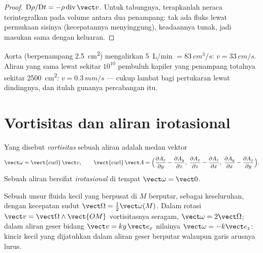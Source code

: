 \begin{proof}
$\mathrm D\rho/\mathrm Dt = -\rho\operatorname{div}\vect v$. Untuk
tabungnya, terapkanlah neraca terintegralkan pada volume antara dua
penampang: tak ada fluks lewat permukaan sisinya (kecepatannya
menyinggung), keadaannya tunak, jadi masukan sama dengan keluaran.
\end{proof}

\begin{example}[Darah]\label{ex:b2:fluid-kinematics:blood}
Aorta (berpenampang \qty{2.5}{cm^2}) mengalirkan \qty{5}{L/min} $= \qty{83}{cm^3/s}$:
$v = \qty{33}{cm/s}$. Aliran yang sama lewat sekitar $10^{10}$
pembuluh kapiler yang penampang totalnya sekitar \qty{2500}{cm^2}: $v = \qty{0.3}{mm/s}$ ---
cukup lambat bagi pertukaran lewat dindingnya, dan itulah gunanya percabangan itu.
\end{example}

\section{Vortisitas dan aliran irotasional}

\begin{definition}[Vortisitas]\label{def:b2:fluid-kinematics:vorticity}
Yang disebut \emph{vortisitas} sebuah aliran adalah medan vektor
\[
\vect\omega = \operatorname{\vect{curl}}\vect v , \qquad
\operatorname{\vect{curl}}\vect A = \Bigl(\frac{\partial A_z}{\partial y} -
\frac{\partial A_y}{\partial z},\; \frac{\partial A_x}{\partial z} - \frac{\partial A_z}
{\partial x},\; \frac{\partial A_y}{\partial x} - \frac{\partial A_x}{\partial y}\Bigr) .
\]
Sebuah aliran bersifat \emph{irotasional} di tempat $\vect\omega = \vect 0$.
\end{definition}

\begin{proposition}\label{prop:b2:fluid-kinematics:rotation}
Sebuah unsur fluida kecil yang berpusat di $M$ berputar, sebagai
keseluruhan, dengan kecepatan sudut $\vect\Omega = \tfrac12\vect\omega(M)$. Dalam
rotasi  $\vect v = \vect\Omega\wedge\vect{OM}$ vortisitasnya seragam,
$\vect\omega = 2\vect\Omega$; dalam aliran geser bidang $\vect v = ky\,\vect e_x$
nilainya $\vect\omega = -k\vect e_z$: kincir kecil yang dijatuhkan dalam aliran geser
berputar walaupun garis arusnya lurus.
\end{proposition}

